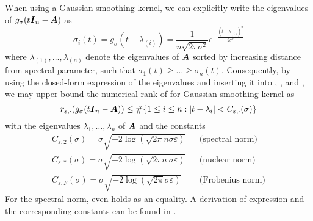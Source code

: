 When using a Gaussian \gls{smoothing-kernel}, we can explicitly write
the eigenvalues of $g_{\sigma}(t\boldsymbol{I}_n - \boldsymbol{A})$ as
\begin{equation}
    \sigma_i(t) = g_{\sigma}(t - \lambda_{(i)}) = \frac{1}{n \sqrt{2 \pi \sigma^2}} e^{-\frac{(t - \lambda_{(i)})^2}{2 \sigma^2}}
    \label{equ:3-nystrom-kernel-function-eigenvalues}
\end{equation}
where $\lambda_{(1)}, \dots, \lambda_{(n)}$ denote the
eigenvalues of $\boldsymbol{A}$ sorted by increasing
distance from \gls{spectral-parameter}, such that $\sigma_1(t) \geq \dots \geq \sigma_n(t)$.
Consequently, by using the closed-form expression of the eigenvalues 
and inserting it into
, , and ,
we may upper bound the numerical rank of 
for Gaussian \gls{smoothing-kernel} as
\begin{equation}
    r_{\varepsilon, \cdot}(g_{\sigma}(t\boldsymbol{I}_n - \boldsymbol{A})) \leq \#\{1\leq i\leq n: |t - \lambda_i| < C_{\varepsilon, \cdot}(\sigma)\}
    \label{equ:3-nystrom-kernel-numerical-rank}
\end{equation}
with the eigenvalues $\lambda_1, \dots, \lambda_n$ of $\boldsymbol{A}$ and the constants
\begin{align}
    C_{\varepsilon, 2}(\sigma) = \sigma \sqrt{-2 \log(\sqrt{2 \pi} n \sigma \varepsilon)} && \text{(spectral norm)} \label{equ:3-nystrom-kernel-numerical-rank-spectral-constant} \\
    C_{\varepsilon, \ast}(\sigma) = \sigma \sqrt{-2 \log(\sqrt{2 \pi n} \sigma \varepsilon)} && \text{(nuclear norm)} \label{equ:3-nystrom-kernel-numerical-rank-nuclear-constant} \\
    C_{\varepsilon, F}(\sigma) = \sigma \sqrt{-2 \log(\sqrt{2 \pi} \sigma \varepsilon)} && \text{(Frobenius norm)} \label{equ:3-nystrom-kernel-numerical-rank-frobenius-constant} 
\end{align}
For the spectral norm,  even holds
as an equality.
A derivation of expression 
and the corresponding constants can be found in .\\

